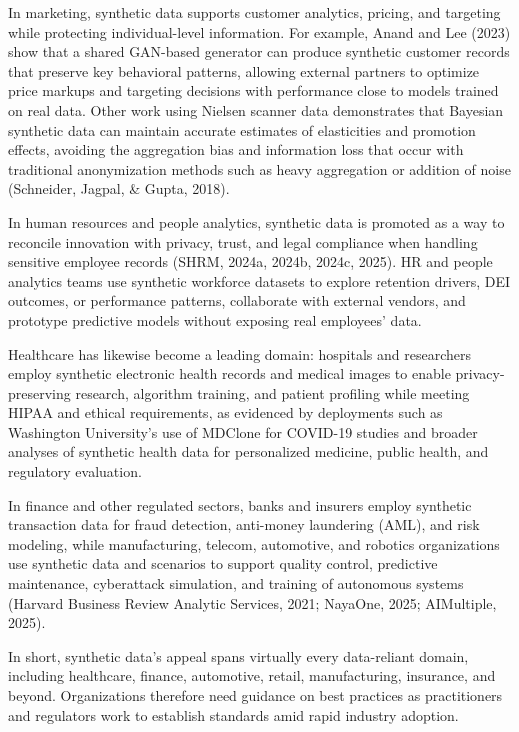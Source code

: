\documentclass[12pt,a4paper]{article}
\begin{document}
In marketing, synthetic data supports customer analytics, pricing, and targeting while protecting individual-level information. For example, Anand and Lee (2023) show that a shared GAN-based generator can produce synthetic customer records that preserve key behavioral patterns, allowing external partners to optimize price markups and targeting decisions with performance close to models trained on real data. Other work using Nielsen scanner data demonstrates that Bayesian synthetic data can maintain accurate estimates of elasticities and promotion effects, avoiding the aggregation bias and information loss that occur with traditional anonymization methods such as heavy aggregation or addition of noise (Schneider, Jagpal, \& Gupta, 2018).

In human resources and people analytics, synthetic data is promoted as a way to reconcile innovation with privacy, trust, and legal compliance when handling sensitive employee records (SHRM, 2024a, 2024b, 2024c, 2025). HR and people analytics teams use synthetic workforce datasets to explore retention drivers, DEI outcomes, or performance patterns, collaborate with external vendors, and prototype predictive models without exposing real employees' data.

Healthcare has likewise become a leading domain: hospitals and researchers employ synthetic electronic health records and medical images to enable privacy-preserving research, algorithm training, and patient profiling while meeting HIPAA and ethical requirements, as evidenced by deployments such as Washington University's use of MDClone for COVID-19 studies and broader analyses of synthetic health data for personalized medicine, public health, and regulatory evaluation.

In finance and other regulated sectors, banks and insurers employ synthetic transaction data for fraud detection, anti-money laundering (AML), and risk modeling, while manufacturing, telecom, automotive, and robotics organizations use synthetic data and scenarios to support quality control, predictive maintenance, cyberattack simulation, and training of autonomous systems (Harvard Business Review Analytic Services, 2021; NayaOne, 2025; AIMultiple, 2025).

In short, synthetic data's appeal spans virtually every data-reliant domain, including healthcare, finance, automotive, retail, manufacturing, insurance, and beyond. Organizations therefore need guidance on best practices as practitioners and regulators work to establish standards amid rapid industry adoption.
\end{document}
